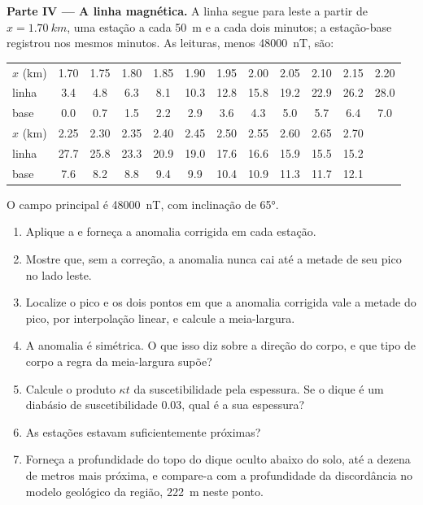 \begin{problem}
\medskip\noindent\textbf{Parte IV --- A linha magnética.} A linha segue
para leste a partir de $x = \qty{1.70}{km}$, uma estação a cada \qty{50}{m} e a cada
dois minutos; a estação-base registrou nos mesmos minutos. As leituras,
menos \qty{48000}{nT}, são:
\begin{center}
\small
\setlength{\tabcolsep}{3.5pt}
\begin{tabular}{lccccccccccc}
\hline
$x$ (km) & 1.70 & 1.75 & 1.80 & 1.85 & 1.90 & 1.95 & 2.00 & 2.05 & 2.10 & 2.15 & 2.20 \\
linha & 3.4 & 4.8 & 6.3 & 8.1 & 10.3 & 12.8 & 15.8 & 19.2 & 22.9 & 26.2 & 28.0 \\
base & 0.0 & 0.7 & 1.5 & 2.2 & 2.9 & 3.6 & 4.3 & 5.0 & 5.7 & 6.4 & 7.0 \\
\hline
$x$ (km) & 2.25 & 2.30 & 2.35 & 2.40 & 2.45 & 2.50 & 2.55 & 2.60 & 2.65 & 2.70 & \\
linha & 27.7 & 25.8 & 23.3 & 20.9 & 19.0 & 17.6 & 16.6 & 15.9 & 15.5 & 15.2 & \\
base & 7.6 & 8.2 & 8.8 & 9.4 & 9.9 & 10.4 & 10.9 & 11.3 & 11.7 & 12.1 & \\
\hline
\end{tabular}
\end{center}
O campo principal é \qty{48000}{nT}, com inclinação de \ang{65}.
\begin{enumerate}[resume]
\item Aplique a  e forneça a anomalia corrigida em
  cada estação.
\item Mostre que, sem a correção, a anomalia nunca cai até a metade
  de seu pico no lado leste.
\item Localize o pico e os dois pontos em que a anomalia corrigida vale
  a metade do pico, por interpolação linear, e calcule a meia-largura.
\item A anomalia é simétrica. O que isso diz sobre a direção do
  corpo, e que tipo de corpo a regra da meia-largura supõe?
\item Calcule o produto $\kappa t$ da suscetibilidade pela espessura.
  Se o dique é um diabásio de suscetibilidade \num{0.03}, qual é a sua
  espessura?
\item As estações estavam suficientemente próximas?
\item Forneça a profundidade do topo do dique oculto abaixo do solo, até
  a dezena de metros mais próxima, e compare-a com a profundidade da
  discordância no modelo geológico da região, \qty{222}{m} neste
  ponto.
\end{enumerate}
\end{problem}
